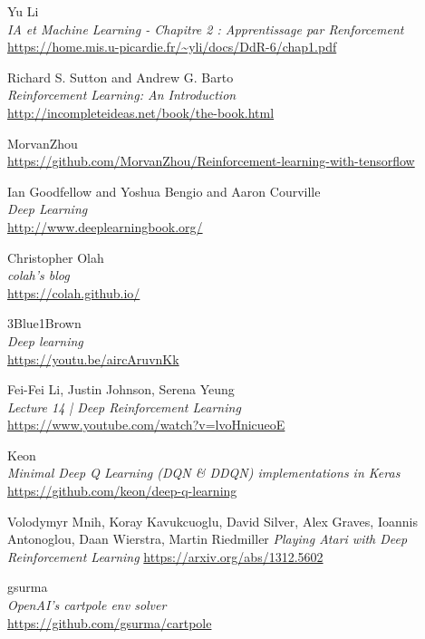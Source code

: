 \begin{thebibliography}{9}

Yu Li \\
\textit{IA et Machine Learning - Chapitre 2 : Apprentissage par Renforcement} \\
\url{https://home.mis.u-picardie.fr/~yli/docs/DdR-6/chap1.pdf}

Richard S. Sutton and Andrew G. Barto\\
\textit{Reinforcement Learning: An Introduction}\\
\url{http://incompleteideas.net/book/the-book.html}

MorvanZhou \\
\url{https://github.com/MorvanZhou/Reinforcement-learning-with-tensorflow}

Ian Goodfellow and Yoshua Bengio and Aaron Courville \\
\textit{Deep Learning} \\
\url{http://www.deeplearningbook.org/}

Christopher Olah \\
\textit{colah's blog} \\
\url{https://colah.github.io/}

3Blue1Brown \\
\textit{Deep learning} \\
\url{https://youtu.be/aircAruvnKk}

Fei-Fei Li, Justin Johnson, Serena Yeung \\
\textit{Lecture 14 | Deep Reinforcement Learning} \\
\url{https://www.youtube.com/watch?v=lvoHnicueoE}

Keon \\
\textit{Minimal Deep Q Learning (DQN \& DDQN) implementations in Keras} \\
\url{https://github.com/keon/deep-q-learning}

Volodymyr Mnih, Koray Kavukcuoglu, David Silver, Alex Graves, Ioannis Antonoglou, Daan Wierstra, Martin Riedmiller
\textit{Playing Atari with Deep Reinforcement Learning}
\url{https://arxiv.org/abs/1312.5602}

gsurma \\
\textit{OpenAI's cartpole env solver} \\
\url{https://github.com/gsurma/cartpole} 


\end{thebibliography}
